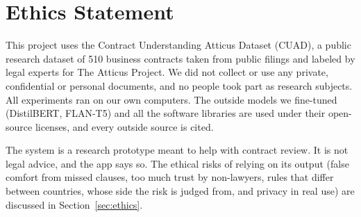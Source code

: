 \section*{Ethics Statement}
This project uses the Contract Understanding Atticus Dataset (CUAD), a public research dataset of 510 business contracts taken from public filings and labeled by legal experts for The Atticus Project. We did not collect or use any private, confidential or personal documents, and no people took part as research subjects. All experiments ran on our own computers. The outside models we fine-tuned (DistilBERT, FLAN-T5) and all the software libraries are used under their open-source licenses, and every outside source is cited.

The system is a research prototype meant to help with contract review. It is not legal advice, and the app says so. The ethical risks of relying on its output (false comfort from missed clauses, too much trust by non-lawyers, rules that differ between countries, whose side the risk is judged from, and privacy in real use) are discussed in Section~\ref{sec:ethics}.
\pagebreak

